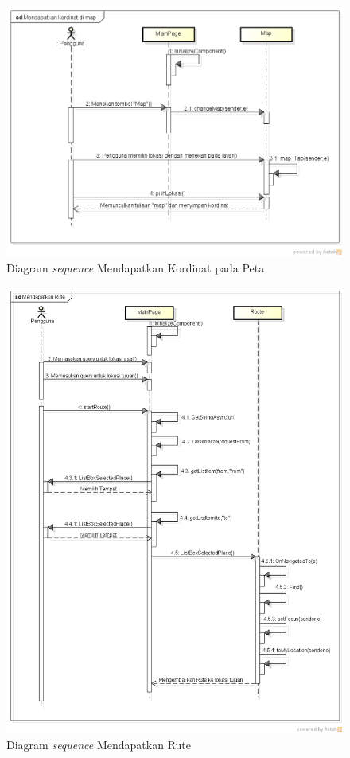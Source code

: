 \begin{figure}[h]
	\centering
		\includegraphics[scale=0.4]{Gambar/sequence/MendapatkanKordinatDiMap}
	\caption{Diagram \textit{sequence} Mendapatkan Kordinat pada Peta}
	\label{fig:sequence lokasi pada peta}
\end{figure}

\begin{figure}[h]
	\centering
		\includegraphics[scale=0.4]{Gambar/sequence/MendapatkanRute}
	\caption{Diagram \textit{sequence} Mendapatkan Rute}
	\label{fig:sequence rute}
\end{figure}

